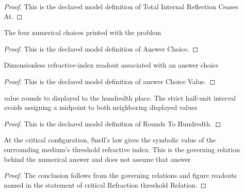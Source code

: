 \begin{proof}
  This is the declared model definition of Total Internal Reflection Ceases At.
\end{proof}
\begin{definition}
  \label{def:physics:phyx-mini-0019:phyxminiproblems-problemphyxmini0019-answerchoice}
  The four numerical choices printed with the problem
\end{definition}
\begin{proof}
  This is the declared model definition of Answer Choice.
\end{proof}
\begin{definition}
  \label{def:physics:phyx-mini-0019:phyxminiproblems-problemphyxmini0019-answerchoicevalue}
  Dimensionless refractive-index readout associated with an answer choice
\end{definition}
\begin{proof}
  This is the declared model definition of answer Choice Value.
\end{proof}
\begin{definition}
  \label{def:physics:phyx-mini-0019:phyxminiproblems-problemphyxmini0019-roundstohundredth}
  value rounds to displayed to the hundredth place. The strict half-unit interval avoids assigning a midpoint to both neighboring displayed values
\end{definition}
\begin{proof}
  This is the declared model definition of Rounds To Hundredth.
\end{proof}
\begin{lemma}
  \label{lem:physics:phyx-mini-0019:phyxminiproblems-problemphyxmini0019-criticalrefraction-thresholdrelation}
  At the critical configuration, Snell's law gives the symbolic value of the surrounding medium's threshold refractive index. This is the governing relation behind the numerical answer and does not assume that answer
\end{lemma}
\begin{proof}
  The conclusion follows from the governing relations and figure readouts named in the statement of critical Refraction threshold Relation.
\end{proof}
